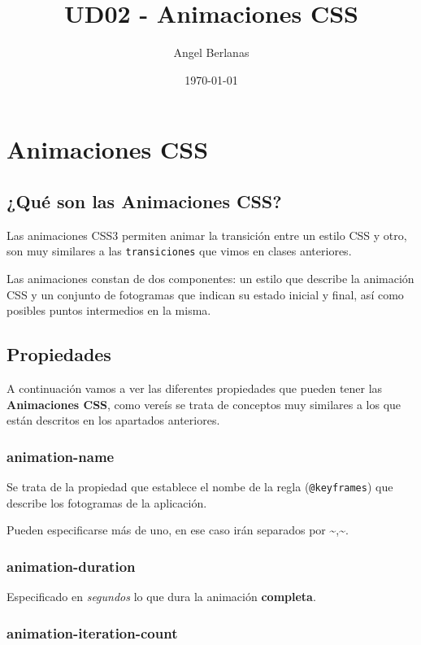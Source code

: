 \documentclass[11pt]{article}
\author{Angel Berlanas}
\date{\today}
\title{UD02 - Animaciones CSS}
\begin{document}
\maketitle
\tableofcontents


\section{Animaciones CSS}
\label{sec-1}

\subsection{¿Qué son las Animaciones CSS?}
\label{sec-1-1}

Las animaciones CSS3 permiten animar la transición entre un estilo CSS y
otro, son muy similares a las \verb~transiciones~ que vimos en clases anteriores. 

Las animaciones constan de dos componentes: un estilo que describe la
animación CSS y un conjunto de fotogramas que indican su estado inicial y final,
así como posibles puntos intermedios en la misma.

\subsection{Propiedades}
\label{sec-1-2}

A continuación vamos a ver las diferentes propiedades que pueden tener las
\textbf{Animaciones CSS}, como vereís se trata de conceptos muy similares a los que
están descritos en los apartados anteriores.

\subsubsection{animation-name}
\label{sec-1-2-1}

Se trata de la propiedad que establece el nombe de la regla (\verb~@keyframes~) que
describe los fotogramas de la aplicación.

Pueden especificarse más de uno, en ese caso irán separados por \textasciitilde{},\textasciitilde{}.

\subsubsection{animation-duration}
\label{sec-1-2-2}

Especificado en \emph{segundos} lo que dura la animación \textbf{completa}.

\subsubsection{animation-iteration-count}
\label{sec-1-2-3}
\end{document}
